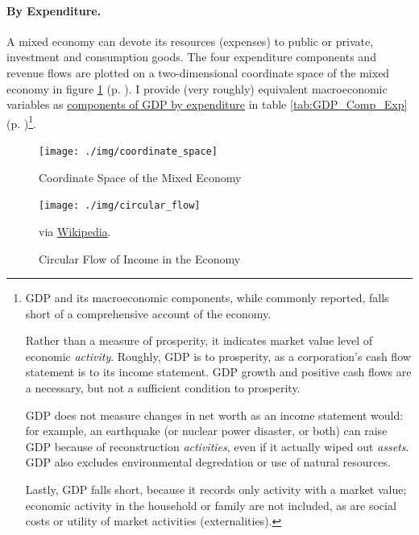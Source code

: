 \paragraph[By Expenditure]{By Expenditure.}  \label{sec:by_expenditure}
A mixed economy can devote its resources (expenses) to public or private, investment and consumption goods. The four expenditure components and revenue flows are plotted on a two-dimensional coordinate space of the mixed economy in figure \ref{fig:coordinate_space} (p. \pageref{fig:coordinate_space}). I provide (very roughly) equivalent macroeconomic variables as \hyperref[tab:GDP_Comp_Exp]{components of GDP by expenditure} in table \ref{tab:GDP_Comp_Exp} (p. \pageref{tab:GDP_Comp_Exp})\footnote{
	\gls{GDP} and its macroeconomic components, while commonly reported, falls short of a comprehensive account of the economy. 
	
	Rather than a measure of prosperity, it indicates market value level of economic \emph{activity}. Roughly, \gls{GDP} is to prosperity, as a corporation's cash flow statement is to its income statement. \gls{GDP} growth and positive cash flows are a necessary, but not a sufficient condition to prosperity. 
	
	\gls{GDP} does not measure changes in net worth as an income statement would: for example, an earthquake (or nuclear power disaster, or both) can raise \gls{GDP} because of reconstruction \emph{activities}, even if it actually wiped out \emph{assets}. \gls{GDP} also excludes environmental degredation or use of natural resources.
	
	Lastly, \gls{GDP} falls short, because it records only activity with a market value; economic activity in the household or family are not included, as are social costs or utility of market activities (externalities).}.
	
\begin{landscape}
 \begin{figure}[htbp]
	\centering
	\texttt{[image: ./img/coordinate\_space]}  
	\caption{Coordinate Space of the Mixed Economy}
	\label{fig:coordinate_space}
\end{figure} %
\end{landscape}

\begin{figure}[htbp]
	\centering
	\texttt{[image: ./img/circular\_flow]}  
	\caption[Circular Flow in the Economy]{Circular Flow of Income in the Economy}
	\begin{flushleft}
		\scriptsize{via \href{http://en.wikipedia.org/wiki/Circular_flow_of_income}{Wikipedia}}.
	\end{flushleft}
	\label{fig:circular_flow}
\end{figure}

